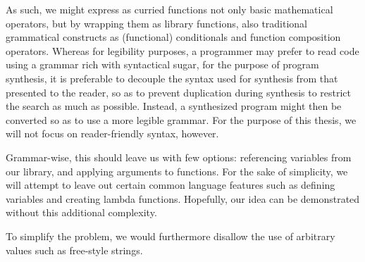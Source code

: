 \documentclass{article}
\begin{document}
As such, we might express as curried functions not only basic mathematical operators,
but by wrapping them as library functions,
also traditional grammatical constructs as (functional) conditionals and function composition operators.
Whereas for legibility purposes, a programmer may prefer to read code using a grammar rich with syntactical sugar,
for the purpose of program synthesis,
it is preferable to decouple the syntax used for synthesis from that presented to the reader,
so as to prevent duplication during synthesis to restrict the search as much as possible.
Instead, a synthesized program might then be converted so as to use a more legible grammar.
For the purpose of this thesis, we will not focus on reader-friendly syntax, however.

Grammar-wise, this should leave us with few options:
referencing variables from our library,
and applying arguments to functions.
For the sake of simplicity,
we will attempt to leave out certain common language features such as defining variables and creating lambda functions.
Hopefully, our idea can be demonstrated without this additional complexity.

To simplify the problem, we would furthermore disallow the use of arbitrary values such as free-style strings.
\end{document}
